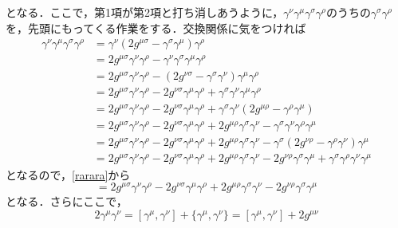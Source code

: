 \documentclass[a4paper,pdflatex,ja=standard]{bxjsarticle}
\newcommand{\gam}[4]{
  \gamma^{#1}\gamma^{#2}\gamma^{#3}\gamma^{#4}
}
\begin{document}
となる．ここで，第1項が第2項と打ち消しあうように，$\gam{\nu}{\mu}{\sigma}{\rho}$のうちの$\gamma^{\sigma}\gamma^{\rho}$を，先頭にもってくる作業をする．交換関係に気をつければ
\begin{align}
  \gam{\nu}{\mu}{\sigma}{\rho}
  &=
  \gamma^{\nu}
  (
    2g^{\mu\sigma}
    -
    \gamma^{\sigma}\gamma^{\mu}
  )
  \gamma^{\rho}
  \nonumber
  \\
  &=
  2g^{\mu\sigma}\gamma^{\nu}\gamma^{\rho}
  -
  \gam{\nu}{\sigma}{\mu}{\rho}
  \nonumber
  \\
  &=
  2g^{\mu\sigma}\gamma^{\nu}\gamma^{\rho}
  -
  (2g^{\nu\sigma}-\gamma^{\sigma}\gamma^{\nu})
  \gamma^{\mu}\gamma^{\rho}
  \nonumber
  \\
  &=
  2g^{\mu\sigma}\gamma^{\nu}\gamma^{\rho}
  -
  2g^{\nu\sigma}\gamma^{\mu}\gamma^{\rho}
  +
  \gam{\sigma}{\nu}{\mu}{\rho}
  \nonumber
  \\
  &=
  2g^{\mu\sigma}\gamma^{\nu}\gamma^{\rho}
  -
  2g^{\nu\sigma}\gamma^{\mu}\gamma^{\rho}
  +
  \gamma^{\sigma}\gamma^{\nu}
  (
    2g^{\mu\rho}-\gamma^{\rho}\gamma^{\mu}
  )
  \nonumber
  \\
  &=
  2g^{\mu\sigma}\gamma^{\nu}\gamma^{\rho}
  -
  2g^{\nu\sigma}\gamma^{\mu}\gamma^{\rho}
  +
  2g^{\mu\rho}\gamma^{\sigma}\gamma^{\nu}
  -
  \gam{\sigma}{\nu}{\rho}{\mu}
  \nonumber
  \\
  &=
  2g^{\mu\sigma}\gamma^{\nu}\gamma^{\rho}
  -
  2g^{\nu\sigma}\gamma^{\mu}\gamma^{\rho}
  +
  2g^{\mu\rho}\gamma^{\sigma}\gamma^{\nu}
  -
  \gamma^{\sigma}
  (2g^{\nu\rho}-\gamma^{\rho}\gamma^{\nu})
  \gamma^{\mu}
  \nonumber
  \\
  &=
  2g^{\mu\sigma}\gamma^{\nu}\gamma^{\rho}
  -
  2g^{\nu\sigma}\gamma^{\mu}\gamma^{\rho}
  +
  2g^{\mu\rho}\gamma^{\sigma}\gamma^{\nu}
  -
  2g^{\nu\rho}\gamma^{\sigma}\gamma^{\mu}
  +
  \gam{\sigma}{\rho}{\nu}{\mu}
\end{align}
となるので，\eqref{rarara}から
\begin{equation}
  [
  \gamma^{\nu}\gamma^{\mu}
  ,
  \gamma^{\sigma}\gamma^{\rho}
  ]
  =
  2g^{\mu\sigma}\gamma^{\nu}\gamma^{\rho}
  -
  2g^{\nu\sigma}\gamma^{\mu}\gamma^{\rho}
  +
  2g^{\mu\rho}\gamma^{\sigma}\gamma^{\nu}
  -
  2g^{\nu\rho}\gamma^{\sigma}\gamma^{\mu}
\end{equation}
となる．さらにここで，
\begin{equation}
  2\gamma^{\mu}\gamma^{\nu}
  =
  [\gamma^{\mu},\gamma^{\nu}]
  +
  \{\gamma^{\mu},\gamma^{\nu}\}
  =
  [\gamma^{\mu},\gamma^{\nu}]
  +
  2g^{\mu\nu}
\end{equation}
\end{document}
